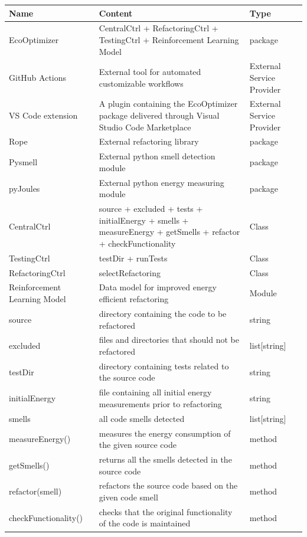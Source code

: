 \documentclass[12pt]{article}
\begin{document}
\renewcommand{\arraystretch}{1.5}
\begin{longtable}{|p{3.5cm}|p{9cm}|p{2cm}|}
  \toprule \textbf{Name} & \textbf{Content} & \textbf{Type} \\
  \midrule
  EcoOptimizer & CentralCtrl + RefactoringCtrl + TestingCtrl + Reinforcement Learning Model & package \\ \hline
  GitHub Actions & External tool for automated customizable workflows & External Service Provider \\ \hline
  VS Code extension & A plugin containing the EcoOptimizer package delivered through Visual Studio Code Marketplace & External Service Provider \\ \hline
  Rope & External refactoring library & package \\ \hline
  Pysmell & External python smell detection module & package \\ \hline
  pyJoules & External python energy measuring module & package \\ \hline
  CentralCtrl & source + excluded + tests + initialEnergy + smells + measureEnergy + getSmells + refactor + checkFunctionality & Class \\ \hline
  TestingCtrl & testDir + runTests & Class \\ \hline
  RefactoringCtrl & selectRefactoring & Class \\ \hline
  Reinforcement Learning Model & Data model for improved energy efficient refactoring & Module \\ \hline
  source & directory containing the code to be refactored & string \\ \hline
  excluded & files and directories that should not be refactored & list[string] \\ \hline
  testDir & directory containing tests related to the source code & string \\ \hline
  initialEnergy & file containing all initial energy measurements prior to refactoring & string \\ \hline
  smells & all code smells detected & list[string] \\ \hline
  measureEnergy() & measures the energy consumption of the given source code & method \\ \hline
  getSmells() & returns all the smells detected in the source code & method \\ \hline
  refactor(smell) & refactors the source code based on the given code smell & method \\ \hline
  checkFunctionality() & checks that the original functionality of the code is maintained & method \\
  \bottomrule
\end{longtable}
\end{document}
